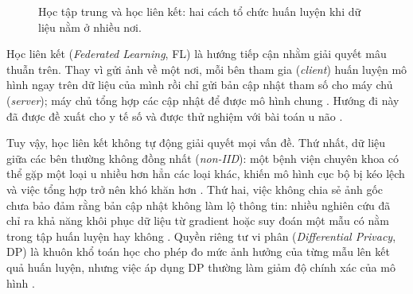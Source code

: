 \documentclass[12pt,a4paper]{report}
\begin{document}
\begin{figure}[H]\centering
{}
\caption{Học tập trung và học liên kết: hai cách tổ chức huấn luyện khi dữ liệu nằm ở nhiều nơi.}\label{fig:central}
\end{figure}

Học liên kết (\textit{Federated Learning}, FL) là hướng tiếp cận nhằm giải quyết mâu thuẫn trên. Thay vì gửi ảnh về một nơi, mỗi bên tham gia (\textit{client}) huấn luyện mô hình ngay trên dữ liệu của mình rồi chỉ gửi bản cập nhật tham số cho máy chủ (\textit{server}); máy chủ tổng hợp các cập nhật để được mô hình chung \citep{mcmahan,kairouz}. Hướng đi này đã được đề xuất cho y tế số và được thử nghiệm với bài toán u não \citep{rieke,sheller}.

Tuy vậy, học liên kết không tự động giải quyết mọi vấn đề. Thứ nhất, dữ liệu giữa các bên thường không đồng nhất (\textit{non-IID}): một bệnh viện chuyên khoa có thể gặp một loại u nhiều hơn hẳn các loại khác, khiến mô hình cục bộ bị kéo lệch và việc tổng hợp trở nên khó khăn hơn \citep{zhao,hsieh}. Thứ hai, việc không chia sẻ ảnh gốc chưa bảo đảm rằng bản cập nhật không làm lộ thông tin: nhiều nghiên cứu đã chỉ ra khả năng khôi phục dữ liệu từ gradient hoặc suy đoán một mẫu có nằm trong tập huấn luyện hay không \citep{zhu,shokri}. Quyền riêng tư vi phân (\textit{Differential Privacy}, DP) là khuôn khổ toán học cho phép đo mức ảnh hưởng của từng mẫu lên kết quả huấn luyện, nhưng việc áp dụng DP thường làm giảm độ chính xác của mô hình \citep{dwork,abadi}.
\end{document}
